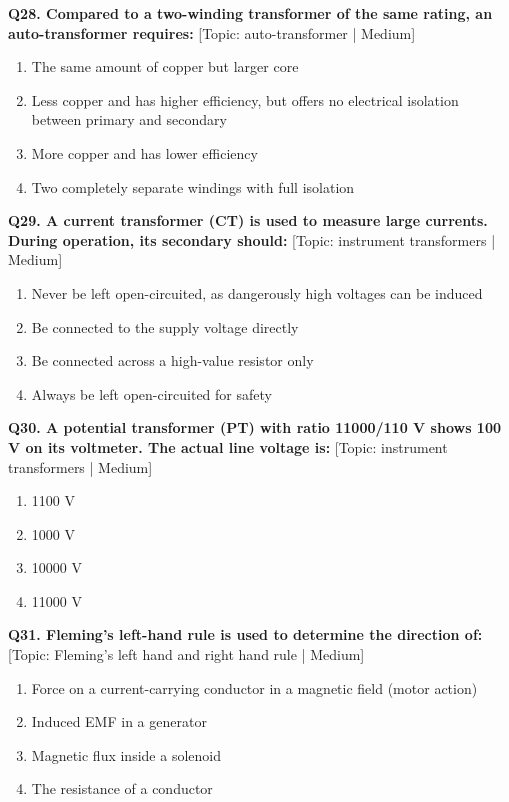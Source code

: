 \noindent\textbf{Q28. Compared to a two-winding transformer of the same rating, an auto-transformer requires:} \hfill [Topic: auto-transformer | Medium]
\begin{enumerate}[label=(\alph*),topsep=2pt,itemsep=1pt,partopsep=0pt,parsep=0pt]
    \item {The same amount of copper but larger core}
    \item {Less copper and has higher efficiency, but offers no electrical isolation between primary and secondary}
    \item {More copper and has lower efficiency}
    \item {Two completely separate windings with full isolation}
\end{enumerate}
\vspace{2mm}

\noindent\textbf{Q29. A current transformer (CT) is used to measure large currents. During operation, its secondary should:} \hfill [Topic: instrument transformers | Medium]
\begin{enumerate}[label=(\alph*),topsep=2pt,itemsep=1pt,partopsep=0pt,parsep=0pt]
    \item {Never be left open-circuited, as dangerously high voltages can be induced}
    \item {Be connected to the supply voltage directly}
    \item {Be connected across a high-value resistor only}
    \item {Always be left open-circuited for safety}
\end{enumerate}
\vspace{2mm}

\noindent\textbf{Q30. A potential transformer (PT) with ratio 11000/110 V shows 100 V on its voltmeter. The actual line voltage is:} \hfill [Topic: instrument transformers | Medium]
\begin{enumerate}[label=(\alph*),topsep=2pt,itemsep=1pt,partopsep=0pt,parsep=0pt]
    \item {1100 V}
    \item {1000 V}
    \item {10000 V}
    \item {11000 V}
\end{enumerate}
\vspace{2mm}

\noindent\textbf{Q31. Fleming's left-hand rule is used to determine the direction of:} \hfill [Topic: Fleming's left hand and right hand rule | Medium]
\begin{enumerate}[label=(\alph*),topsep=2pt,itemsep=1pt,partopsep=0pt,parsep=0pt]
    \item {Force on a current-carrying conductor in a magnetic field (motor action)}
    \item {Induced EMF in a generator}
    \item {Magnetic flux inside a solenoid}
    \item {The resistance of a conductor}
\end{enumerate}
\vspace{2mm}


